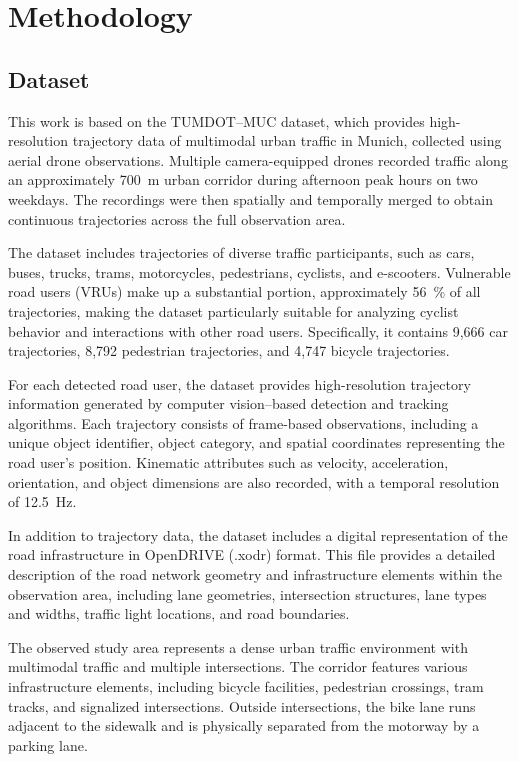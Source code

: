 \chapter{Methodology}



\section{Dataset}

This work is based on the TUMDOT–MUC dataset, which provides high-resolution trajectory data of multimodal urban traffic in Munich, collected using aerial drone observations. Multiple camera-equipped drones recorded traffic along an approximately 700~m urban corridor during afternoon peak hours on two weekdays. The recordings were then spatially and temporally merged to obtain continuous trajectories across the full observation area.

The dataset includes trajectories of diverse traffic participants, such as cars, buses, trucks, trams, motorcycles, pedestrians, cyclists, and e-scooters. Vulnerable road users (VRUs) make up a substantial portion, approximately 56~\% of all trajectories, making the dataset particularly suitable for analyzing cyclist behavior and interactions with other road users. Specifically, it contains 9,666 car trajectories, 8,792 pedestrian trajectories, and 4,747 bicycle trajectories.

For each detected road user, the dataset provides high-resolution trajectory information generated by computer vision–based detection and tracking algorithms. Each trajectory consists of frame-based observations, including a unique object identifier, object category, and spatial coordinates representing the road user’s position. Kinematic attributes such as velocity, acceleration, orientation, and object dimensions are also recorded, with a temporal resolution of 12.5~Hz.

In addition to trajectory data, the dataset includes a digital representation of the road infrastructure in OpenDRIVE (.xodr) format. This file provides a detailed description of the road network geometry and infrastructure elements within the observation area, including lane geometries, intersection structures, lane types and widths, traffic light locations, and road boundaries.

The observed study area represents a dense urban traffic environment with multimodal traffic and multiple intersections. The corridor features various infrastructure elements, including bicycle facilities, pedestrian crossings, tram tracks, and signalized intersections. Outside intersections, the bike lane runs adjacent to the sidewalk and is physically separated from the motorway by a parking lane.

